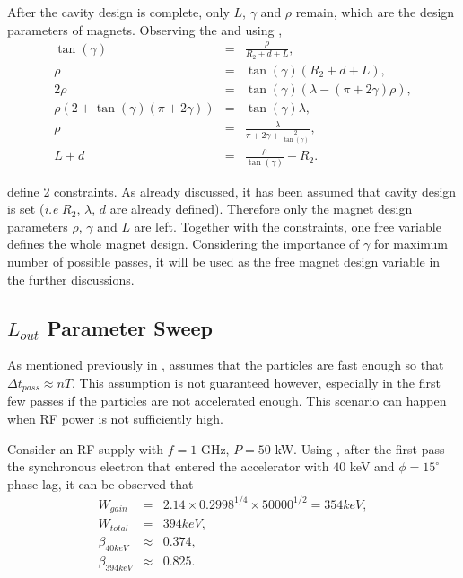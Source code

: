 \documentclass[a4paper,oneside,12pt]{report}
\numberwithin{equation}{chapter}
\begin{document}
\vspace{-20pt}
After the cavity design is complete, only $L$, $\gamma$ and $\rho$ remain, which are the design parameters of magnets.
Observing the  and using ,
\vspace{-20pt}\begin{eqnarray}
    \tan (\gamma) &=& \frac{\rho}{R_2 + d + L}  ,\\
    \rho &=&  \tan (\gamma) (R_2 + d + L)  , \\
    2\rho &=& \tan (\gamma) (\lambda - (\pi + 2\gamma)\rho)  , \\
    \rho (2 + \tan (\gamma)(\pi + 2\gamma)) &=&  \tan (\gamma) \lambda   ,\\
    \rho &=& \frac{\lambda}{\pi + 2\gamma + \frac{2}{\tan (\gamma)}}   ,\label{eq:magnet_rho_constraint} \\
    L + d &=& \frac{\rho}{\tan (\gamma)} - R_2 . \label{eq:magnet_L_constraint}
\end{eqnarray}

\vspace{-10pt}
 define 2 constraints. As already discussed, it has been assumed that cavity design is set (\textit{i.e} $R_2$, $\lambda$, $d$ are already defined).
Therefore only the magnet design parameters $\rho$, $\gamma$ and $L$ are left. Together with the constraints, one free variable defines the whole magnet design. 
Considering the importance of $\gamma$ for maximum number of possible passes, it will be used as the free magnet design variable in the further discussions.


\subsection{$L_{out}$ Parameter Sweep} \label{sec:parameter_sweep}

As mentioned previously in ,  assumes that the particles are fast enough so that $\Delta t_{pass} \approx n T$. 
This assumption is not guaranteed however, especially in the first few passes if the particles are not accelerated enough. 
This scenario can happen when RF power is not sufficiently high. 

Consider an RF supply with $f=1$ GHz, $P=50$ kW. Using , 
after the first pass the synchronous electron that entered the accelerator with $40$ keV and $\phi=15^\circ$ phase lag,
it can be observed that
\vspace{-20pt}\begin{eqnarray}
    W_{gain} &=& 2.14\times0.2998^{1/4}\times 50000^{1/2} = 354keV   ,\\
    W_{total} &=& 394 keV   ,\\
    \beta_{40keV} &\approx& 0.374   ,\\
    \beta_{394keV} &\approx& 0.825 .
\end{eqnarray}
\end{document}
